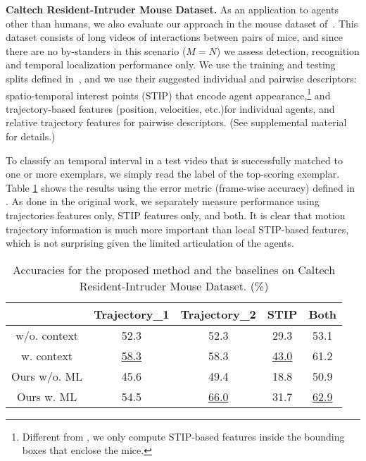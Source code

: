 \vspace{0.05in} \noindent\textbf{Caltech Resident-Intruder Mouse Dataset.} As an application to agents other than humans, we also evaluate our approach in the mouse dataset of~\cite{CRIM13}. This dataset consists of long videos of interactions between pairs of mice, and since there are no by-standers in this scenario (\ie $M=N$) we assess detection, recognition and temporal localization performance only. We use the training and testing splits defined in~\cite{CRIM13}, and we use their suggested individual and pairwise descriptors: spatio-temporal interest points (STIP) that encode agent appearance,\footnote{Different from \cite{CRIM13}, we only compute STIP-based features inside the bounding boxes that enclose the mice.} and trajectory-based features (position, velocities, etc.)for individual agents, and relative trajectory features for pairwise descriptors. (See supplemental material for details.)

To classify an temporal interval in a test video that is successfully matched to one or more exemplars, we simply read the label of the top-scoring exemplar. Table \ref{CRIMAccu} shows the results using the error metric (frame-wise accuracy) defined in \cite{CRIM13}. As done in the original work, we separately measure performance using trajectories features only, STIP features only, and both. It is clear that motion trajectory information is much more important than local STIP-based features, which is not surprising given the limited articulation of the agents.

\begin{table}[h]
\centering \caption{Accuracies for the proposed method and the baselines on Caltech Resident-Intruder Mouse Dataset. (\%) }
\footnotesize{
\begin{tabular}{|c||c|c|c|c|}
\hline   & Trajectory\_1  & Trajectory\_2 & STIP & Both \\
\hline \cite{CRIM13} w/o. context & 52.3  & 52.3 & 29.3 & 53.1\\
\hline \cite{CRIM13} w. context &  \underline{58.3} & 58.3 & \underline{43.0} & 61.2\\
\hline Ours w/o. ML &  45.6 & 49.4 & 18.8 & 50.9 \\
\hline Ours w. ML & 54.5 & \underline{66.0} & 31.7 & \underline{62.9}\\
\hline 
\end{tabular}
}
\label{CRIMAccu}
\end{table}

